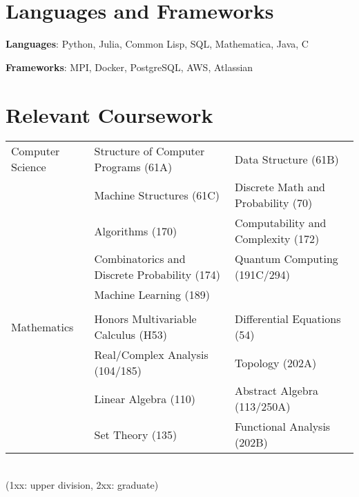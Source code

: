 \documentclass[a4paper,10pt]{article}
\begin{document}
\section{Languages and Frameworks}
\textbf{Languages}: Python, Julia, Common Lisp, SQL, Mathematica, Java, C

\textbf{Frameworks}: MPI, Docker, PostgreSQL, AWS, Atlassian

\section{Relevant Coursework}
\begin{tabularx}{\textwidth}{l|ll}
Computer Science & Structure of Computer Programs (61A) & Data Structure (61B) \\ & Machine Structures (61C) & Discrete Math and Probability (70) \\& Algorithms (170) & Computability and Complexity (172) \\ & Combinatorics and Discrete Probability (174) & Quantum Computing (191C/294)\\
& Machine Learning (189) & \\
\multicolumn{2}{c}{}
\\
Mathematics & Honors Multivariable Calculus (H53) &
Differential Equations (54) \\ & Real/Complex Analysis (104/185)& Topology (202A)\\ & Linear Algebra (110) & Abstract Algebra (113/250A)  \\
& Set Theory (135) & Functional Analysis (202B)\\
\end{tabularx}
\\
\hspace*{0pt}\hfill{\footnotesize{(1xx: upper division, 2xx: graduate})}
\end{document}
